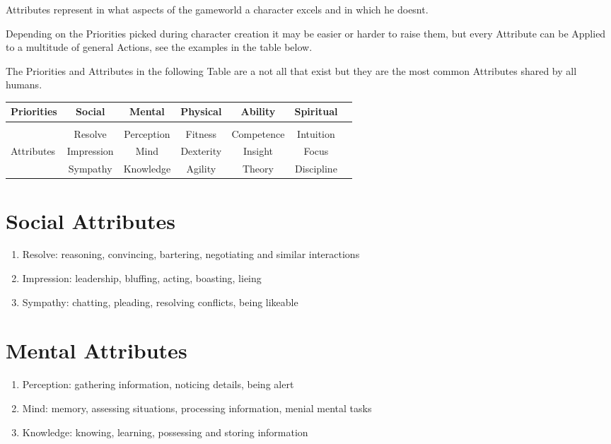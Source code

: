 Attributes represent in what aspects of the gameworld a character excels and in which he doesnt.\par
Depending on the Priorities picked during character creation it may be easier or harder to raise them, but every
Attribute can be Applied to a multitude of general Actions, see the examples in the table below.\par
The Priorities and Attributes in the following Table are a not all that exist
but they are the most common Attributes shared by all humans.\par
\begin{tabular}{l||cccccc}
    Priorities      &Social        &Mental         &Physical    &Ability     &Spiritual  \\\hline\\
                    &Resolve       &Perception     &Fitness     &Competence  &Intuition \\
    Attributes      &Impression    &Mind           &Dexterity   &Insight     &Focus\\
                    &Sympathy      &Knowledge      &Agility     &Theory      &Discipline\\



\end{tabular}\vspace{1cm}
\section{Social Attributes}\label{sec:charisma-attributes}
\begin{enumerate}[label= -]
    \item {Resolve}: reasoning, convincing, bartering, negotiating and similar interactions
    \item {Impression}: leadership, bluffing, acting, boasting, lieing
    \item {Sympathy}: chatting, pleading, resolving conflicts, being likeable
\end{enumerate}
\section{Mental Attributes}\label{sec:mental-attributes}
\begin{enumerate}[label=-]
    \item {Perception}: gathering information, noticing details, being alert
    \item {Mind}: memory, assessing situations, processing information, menial mental tasks
    \item {Knowledge}: knowing, learning, possessing and storing information
\end{enumerate}

